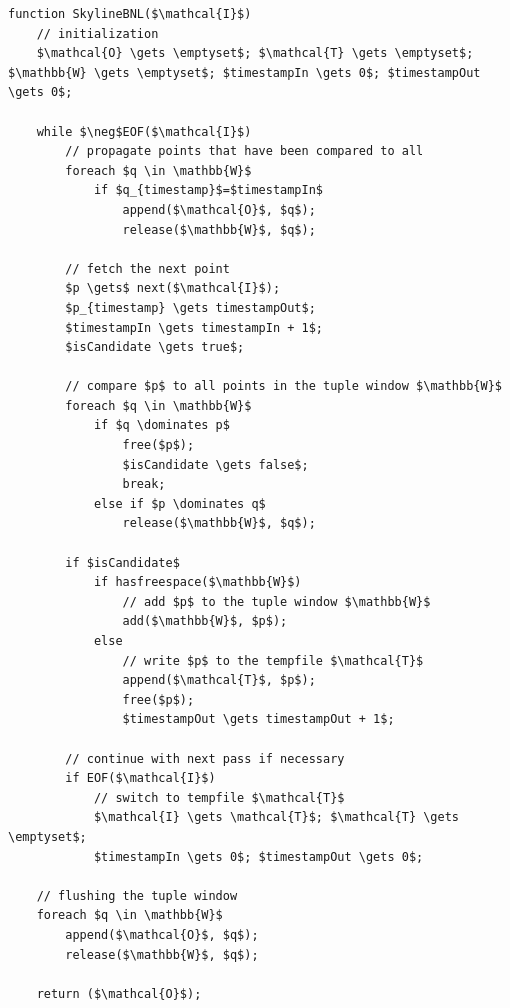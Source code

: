 \begin{lstlisting}[language=pseudo, 
caption={Pseudo-code for Original Block-Nested-Loops (BNL) Algorithm, which does not terminate in all cases.},
label={code:bnl}]
function SkylineBNL($\mathcal{I}$)
	// initialization
	$\mathcal{O} \gets \emptyset$; $\mathcal{T} \gets \emptyset$; $\mathbb{W} \gets \emptyset$; $timestampIn \gets 0$; $timestampOut \gets 0$;

	while $\neg$EOF($\mathcal{I}$)
		// propagate points that have been compared to all
		foreach $q \in \mathbb{W}$
			if $q_{timestamp}$=$timestampIn$
				append($\mathcal{O}$, $q$);
				release($\mathbb{W}$, $q$);

		// fetch the next point
		$p \gets$ next($\mathcal{I}$);
		$p_{timestamp} \gets timestampOut$;
		$timestampIn \gets timestampIn + 1$;
		$isCandidate \gets true$;

		// compare $p$ to all points in the tuple window $\mathbb{W}$
		foreach $q \in \mathbb{W}$
			if $q \dominates p$
				free($p$);
				$isCandidate \gets false$;
				break;
			else if $p \dominates q$
				release($\mathbb{W}$, $q$);

		if $isCandidate$
			if hasfreespace($\mathbb{W}$)
				// add $p$ to the tuple window $\mathbb{W}$
				add($\mathbb{W}$, $p$);
			else
				// write $p$ to the tempfile $\mathcal{T}$
				append($\mathcal{T}$, $p$);
				free($p$);
				$timestampOut \gets timestampOut + 1$;

		// continue with next pass if necessary
		if EOF($\mathcal{I}$)
			// switch to tempfile $\mathcal{T}$
			$\mathcal{I} \gets \mathcal{T}$; $\mathcal{T} \gets \emptyset$;
			$timestampIn \gets 0$; $timestampOut \gets 0$;

	// flushing the tuple window
	foreach $q \in \mathbb{W}$
		append($\mathcal{O}$, $q$);
		release($\mathbb{W}$, $q$);

	return ($\mathcal{O}$);
\end{lstlisting}


